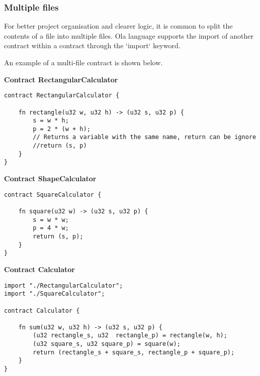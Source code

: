 \subsubsection{Multiple files}

For better project organisation and clearer logic, it is common to split the contents of a file into multiple files. Ola language supports the import of another contract within a contract through the `import` keyword.

An example of a multi-file contract is shown below.

\textbf{Contract RectangularCalculator}

\begin{lstlisting}
contract RectangularCalculator {
  
    fn rectangle(u32 w, u32 h) -> (u32 s, u32 p) {
        s = w * h;
        p = 2 * (w + h);
        // Returns a variable with the same name, return can be ignore
        //return (s, p)
    }
}
\end{lstlisting}

\textbf{Contract ShapeCalculator}

\begin{lstlisting}
contract SquareCalculator {

    fn square(u32 w) -> (u32 s, u32 p) {
        s = w * w;
        p = 4 * w;
        return (s, p);
    }
}
\end{lstlisting}

\textbf{Contract Calculator}

\begin{lstlisting}
import "./RectangularCalculator";
import "./SquareCalculator";

contract Calculator {
  
    fn sum(u32 w, u32 h) -> (u32 s, u32 p) {
        (u32 rectangle_s, u32  rectangle_p) = rectangle(w, h);
        (u32 square_s, u32 square_p) = square(w);
        return (rectangle_s + square_s, rectangle_p + square_p);
    }
}
\end{lstlisting}

